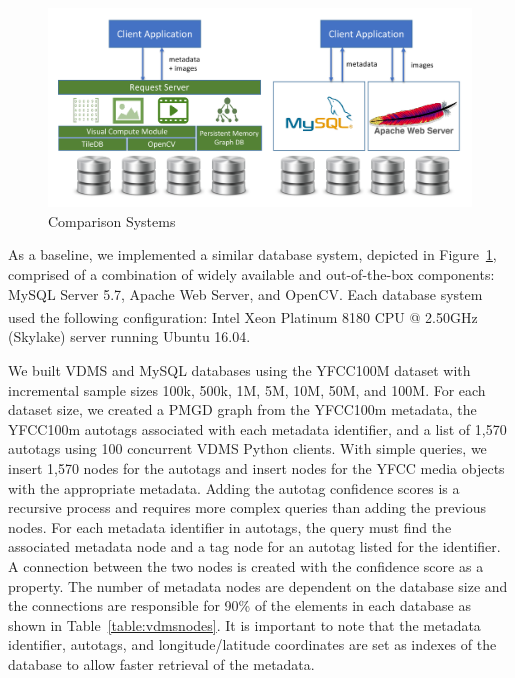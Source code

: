\begin{figure}[]
\centering
\includegraphics[width=\textwidth]{figures/comparison_system}
\caption{Comparison Systems}
\label{fig:systems}
\end{figure}

As a baseline, we implemented a similar database system, depicted in Figure~\ref{fig:systems}, comprised of a combination of widely available and out-of-the-box components: MySQL Server 5.7, Apache Web Server, and OpenCV.  Each database system used the following configuration: Intel\textsuperscript{\textregistered} Xeon\textsuperscript{\textregistered} Platinum 8180 CPU @ 2.50GHz (Skylake) server running Ubuntu 16.04.

We built VDMS and MySQL databases using the YFCC100M dataset with incremental sample sizes 100k, 500k, 1M, 5M, 10M, 50M, and 100M. For each dataset size, we created a PMGD graph from the YFCC100m metadata, the YFCC100m autotags associated with each metadata identifier, and a list of 1,570 autotags using 100 concurrent VDMS Python clients.  With simple queries, we insert 1,570 nodes for the autotags and insert nodes for the YFCC media objects with the appropriate metadata.  Adding the autotag confidence scores is a recursive process and requires more complex queries than adding the previous nodes. For each metadata identifier in autotags, the query must find the associated metadata node and a tag node for an autotag listed for the identifier.  A connection between the two nodes is created with the confidence score as a property. The number of metadata nodes are dependent on the database size and the connections are responsible for 90\% of the elements in each database as shown in Table~\ref{table:vdmsnodes}. It is important to note that the metadata identifier, autotags, and longitude/latitude coordinates are set as indexes of the database to allow faster retrieval of the metadata.

